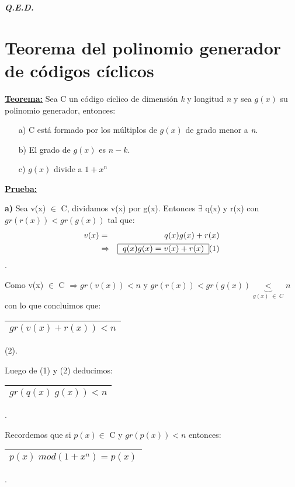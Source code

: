 \documentclass[12pt,a4paper]{report}
\newcommand{\QED}{\hfill \textit{\textbf{Q.E.D.}}}
\begin{document}
		\QED

	\section{Teorema del polinomio generador de códigos cíclicos}
		\textbf{\underline{Teorema:}} Sea C un código cíclico de dimensión \textit{k} y longitud \textit{n} y sea $g(x)$ su polinomio generador, entonces:
			\begin{itemize}
				\item[a)] C está formado por los múltiplos de $g(x)$ de grado menor a \textit{n}.
				\item[b)] El grado de $g(x)$ es $n - k$.
				\item[c)] $g(x)$ divide a $1 + x^{n}$
			\end{itemize}

		\textbf{\underline{Prueba:}}
			\par \textbf{a)} Sea v(x) $\in$ C, dividamos v(x) por g(x). Entonces $\exists$ q(x) y r(x) con $gr(r(x)) < gr(g(x))$ tal que:
			\begin{eqnarray}
				\nonumber v(x) &=& q(x) g(x) + r(x) \\
				\nonumber & \Rightarrow & \begin{tabular}{|c|} \hline $q(x) g(x) = v(x) + r(x) $ \\ \hline \end{tabular} (1)
			\end{eqnarray}.

			\par Como v(x) $\in$ C $\Rightarrow gr(v(x)) < n$ y $gr(r(x)) < gr(g(x)) \underbrace{<}_{g(x) \; \in \; C} n $ con lo que concluimos que:
			\begin{center}
				\begin{tabular}{|c|} \hline $gr(v(x) + r(x)) < n $ \\ \hline \end{tabular} (2).
			\end{center}
			\par Luego de (1) y (2) deducimos: \begin{tabular}{|c|} \hline $gr(q(x) \; g(x)) < n $ \\ \hline \end{tabular}.

			\vspace{3mm}
			\par Recordemos que si $p(x) \in$ C y $gr(p(x)) < n$ entonces: \begin{tabular}{|c|} \hline $p(x) \; mod (1+ x^{n}) = p(x)$ \\\hline \end{tabular}.
\end{document}
